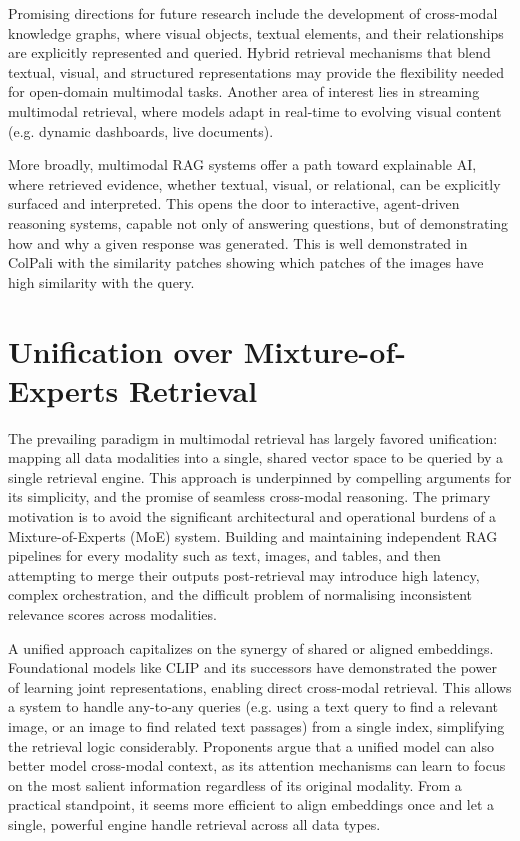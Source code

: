 \documentclass[12pt,twoside]{report}
\begin{document}
Promising directions for future research include the development of cross-modal knowledge graphs, where visual objects, textual elements, and their relationships are explicitly represented and queried. Hybrid retrieval mechanisms that blend textual, visual, and structured representations may provide the flexibility needed for open-domain multimodal tasks. Another area of interest lies in streaming multimodal retrieval, where models adapt in real-time to evolving visual content (e.g. dynamic dashboards, live documents).

More broadly, multimodal RAG systems offer a path toward explainable AI\cite{ExplainAI}, where retrieved evidence, whether textual, visual, or relational, can be explicitly surfaced and interpreted. This opens the door to interactive, agent-driven reasoning systems, capable not only of answering questions, but of demonstrating how and why a given response was generated. This is well demonstrated in ColPali with the similarity patches showing which patches of the images have high similarity with the query.


\section{Unification over Mixture-of-Experts Retrieval}

The prevailing paradigm in multimodal retrieval has largely favored unification: mapping all data modalities into a single, shared vector space to be queried by a single retrieval engine. This approach is underpinned by compelling arguments for its simplicity, and the promise of seamless cross-modal reasoning. The primary motivation is to avoid the significant architectural and operational burdens of a Mixture-of-Experts (MoE) system. Building and maintaining independent RAG pipelines for every modality such as text, images, and tables, and then attempting to merge their outputs post-retrieval may introduce high latency, complex orchestration, and the difficult problem of normalising inconsistent relevance scores across modalities.

A unified approach capitalizes on the synergy of shared or aligned embeddings. Foundational models like CLIP\cite{CLIP} and its successors have demonstrated the power of learning joint representations, enabling direct cross-modal retrieval. This allows a system to handle any-to-any queries (e.g. using a text query to find a relevant image, or an image to find related text passages) from a single index, simplifying the retrieval logic considerably. Proponents argue that a unified model can also better model cross-modal context, as its attention mechanisms can learn to focus on the most salient information regardless of its original modality. From a practical standpoint, it seems more efficient to align embeddings once and let a single, powerful engine handle retrieval across all data types.
\end{document}
